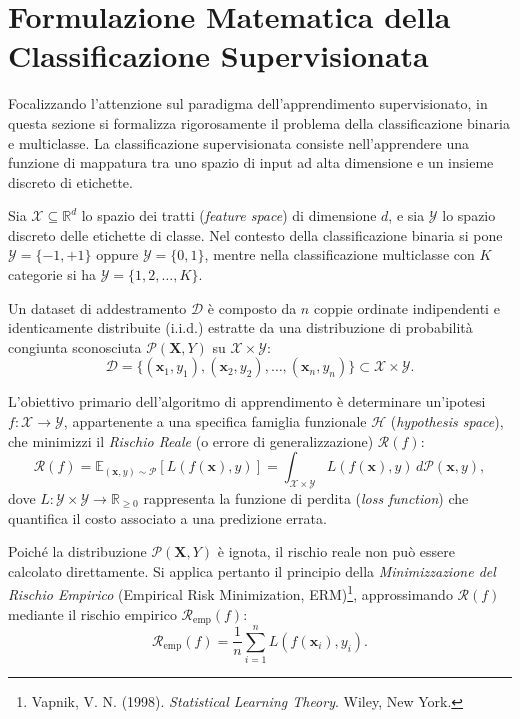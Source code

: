 \section{Formulazione Matematica della Classificazione Supervisionata}

Focalizzando l'attenzione sul paradigma dell'apprendimento supervisionato, in questa sezione si formalizza rigorosamente il problema della classificazione binaria e multiclasse. La classificazione supervisionata consiste nell'apprendere una funzione di mappatura tra uno spazio di input ad alta dimensione e un insieme discreto di etichette.

Sia $\mathcal{X} \subseteq \mathbb{R}^d$ lo spazio dei tratti (\textit{feature space}) di dimensione $d$, e sia $\mathcal{Y}$ lo spazio discreto delle etichette di classe. Nel contesto della classificazione binaria si pone $\mathcal{Y} = \{-1, +1\}$ oppure $\mathcal{Y} = \{0, 1\}$, mentre nella classificazione multiclasse con $K$ categorie si ha $\mathcal{Y} = \{1, 2, \dots, K\}$.

Un dataset di addestramento $\mathcal{D}$ è composto da $n$ coppie ordinate indipendenti e identicamente distribuite (i.i.d.) estratte da una distribuzione di probabilità congiunta sconosciuta $\mathcal{P}(\mathbf{X}, Y)$ su $\mathcal{X} \times \mathcal{Y}$:
\begin{equation}
\mathcal{D} = \{(\mathbf{x}_1, y_1), (\mathbf{x}_2, y_2), \dots, (\mathbf{x}_n, y_n)\} \subset \mathcal{X} \times \mathcal{Y}.
\end{equation}

L'obiettivo primario dell'algoritmo di apprendimento è determinare un'ipotesi $f: \mathcal{X} \to \mathcal{Y}$, appartenente a una specifica famiglia funzionale $\mathcal{H}$ (\textit{hypothesis space}), che minimizzi il \textit{Rischio Reale} (o errore di generalizzazione) $\mathcal{R}(f)$:
\begin{equation}
\mathcal{R}(f) = \mathbb{E}_{(\mathbf{x}, y) \sim \mathcal{P}} [L(f(\mathbf{x}), y)] = \int_{\mathcal{X} \times \mathcal{Y}} L(f(\mathbf{x}), y) \, d\mathcal{P}(\mathbf{x}, y),
\end{equation}
dove $L: \mathcal{Y} \times \mathcal{Y} \to \mathbb{R}_{\geq 0}$ rappresenta la funzione di perdita (\textit{loss function}) che quantifica il costo associato a una predizione errata.

Poiché la distribuzione $\mathcal{P}(\mathbf{X}, Y)$ è ignota, il rischio reale non può essere calcolato direttamente. Si applica pertanto il principio della \textit{Minimizzazione del Rischio Empirico} (Empirical Risk Minimization, ERM)\footnote{Vapnik, V. N. (1998). \textit{Statistical Learning Theory}. Wiley, New York.}, approssimando $\mathcal{R}(f)$ mediante il rischio empirico $\mathcal{R}_{\text{emp}}(f)$:
\begin{equation}
\mathcal{R}_{\text{emp}}(f) = \frac{1}{n} \sum_{i=1}^{n} L(f(\mathbf{x}_i), y_i).
\end{equation}


